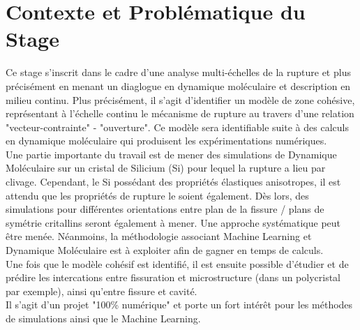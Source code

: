 \section{Contexte et Problématique du Stage} %

    Ce stage s'inscrit dans le cadre d'une analyse multi-échelles de la rupture et plus précisément en menant un diaglogue en dynamique moléculaire et description en milieu continu. Plus précisément, il s'agit d'identifier un modèle de zone cohésive, représentant à l'échelle continu le mécanisme de rupture au travers d'une relation "vecteur-contrainte" - "ouverture". Ce modèle sera identifiable suite à des calculs en dynamique moléculaire qui produisent les expérimentations numériques. \\

    Une partie importante du travail est de mener des simulations de Dynamique Moléculaire sur un cristal de Silicium (Si) pour lequel la rupture a lieu par clivage. Cependant, le Si possédant des propriétés élastiques anisotropes, il est attendu que les propriétés de rupture le soient également. Dès lors, des simulations pour différentes orientations entre plan de la fissure / plans de symétrie critallins seront également à mener. Une approche systématique peut être menée. Néanmoins, la méthodologie associant Machine Learning et Dynamique Moléculaire est à exploiter afin de gagner en temps de calculs. \\
    
    Une fois que le modèle cohésif est identifié, il est ensuite possible d'étudier et de prédire les intercations entre fissuration et microstructure (dans un polycristal par exemple), ainsi qu'entre fissure et cavité. \\

    Il s'agit d'un projet "100\% numérique" et porte un fort intérêt pour les méthodes de simulations ainsi que le Machine Learning. 